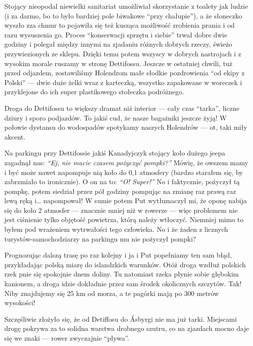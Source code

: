 Stojący nieopodal niewielki sanitariat umożliwiał skorzystanie z toalety jak ludzie (i za darmo, bo to było bardziej pole biwakowe “przy chałupie”), a że słoneczko wyszło zza chmur to pojawiła się też kusząca możliwość zrobienia prania i od razu wysuszenia go. Proces “konserwacji sprzętu i siebie” trwał dobre dwie godziny i polegał między innymi na zjadaniu różnych dobrych rzeczy, świeżo przywiezionych ze sklepu. Dzięki temu potem wszyscy w dobrych nastrojach i z wysokim morale ruszamy w stronę Dettifossu. Jeszcze w ostatniej chwili, tuż przed odjazdem, zostawiliśmy Holendrom małe słodkie pozdrowienia “od ekipy z Polski” --- dwie duże żelki wraz z karteczką, wszystko zapakowane w woreczek i przyklejone do ich super plastikowego stołeczka podróżnego.

Droga do Dettifossu to większy dramat niż interior --- cały czas “tarka”, liczne dziury i sporo podjazdów. To jakiś cud, że nasze bagażniki jeszcze żyją! W połowie dystansu do wodospadów spotykamy naszych Holendrów --- ot, taki miły akcent.


Na parkingu przy Dettifossie jakiś Kanadyjczyk stojący koło dużego jeepa zagadnął nas: \emph{“Ej, nie macie czasem pożyczyć pompki?”} Mówię, że owszem mamy i być może nawet napompuje nią koło do 0,1 atmosfery (bardzo starałem się, by zabrzmiało to ironicznie). O on na to: \emph{“O! Super!”} No i faktycznie, pożyczył tą pompkę, potem siedział przez pół godziny pompując na zmianę raz prawą raz lewą ręką i… napompował! W sumie potem Put wytłumaczył mi, że oponę nabija się do koło 2 atmosfer --- znacznie mniej niż w rowerze --- więc problemem nie jest ciśnienie tylko objętość powietrza, którą należy wtłoczyć. Niemniej mimo to byłem pod wrażeniem wytrwałości tego człowieka. No i że żaden z licznych turystów-samochodziarzy na parkingu mu nie pożyczył pompki?

Prognozując dalszą trasę po raz kolejny i ja i Put popełniamy ten sam błąd, przykładając polską miarę do islandzkich warunków. Otóż droga wzdłuż polskich rzek pnie się spokojnie dnem doliny. Tu natomiast rzeka płynie sobie głębokim kanionem, a droga idzie dokładnie przez sam środek okolicznych szczytów. Tak! Niby znajdujemy się 25 km od morza, a te pagórki mają po 300 metrów wysokości!

Szczęśliwie złożyło się, że od Detiffosu do Ásbyrgi nie ma już tarki. Miejscami drogę pokrywa za to solidna warstwa drobnego szutru, co na zjazdach mocno daje się we znaki --- rower zwyczajnie “pływa”.

